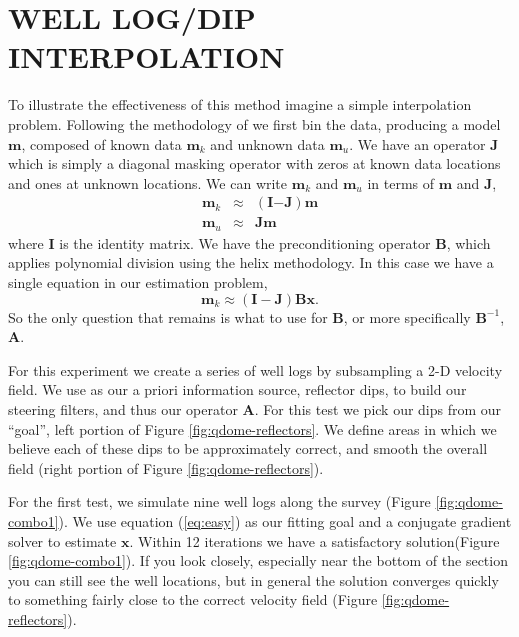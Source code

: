 \section{WELL LOG/DIP INTERPOLATION}
To illustrate the effectiveness of this method
imagine a simple interpolation problem.
Following the methodology of \cite{Fomel.sep.95.sergey1} we first bin the 
data, producing
a model $\mathbf m$, composed of known data $\mathbf m_k$ and unknown data 
$\mathbf m_u$.  We 
have an operator $\mathbf J$ which is simply a diagonal masking operator with 
zeros at known data locations and ones at unknown locations. We can write
$\mathbf m_k$ and $\mathbf m_u$ in terms of $\mathbf m$ and $\mathbf J$,
\begin{eqnarray}
\mathbf m_k &\approx& (\mathbf I\mathbf - \mathbf J)\mathbf m \\
\mathbf m_u &\approx& \mathbf J \mathbf m
\end{eqnarray}
where $\mathbf I$ is the identity matrix.  
We have the preconditioning operator $\mathbf B$, which applies polynomial
division using the helix methodology.  In this case we have a 
single equation in our estimation problem,
\begin{equation}
\mathbf m_k \approx (\mathbf I-\mathbf J) \mathbf B \mathbf x .
\label{eq:easy}
\end{equation}
So the only question that remains is what to use for $\mathbf B$, or 
more specifically $\mathbf B^{-1}$, $\mathbf A$.
\par
For this experiment  
we create a series of well logs by subsampling a 2-D velocity field.
We use as our a priori information source, reflector dips,
to build  our steering filters, and thus our operator $\mathbf A$. 
For this test we  pick our dips  from our ``goal'',
left portion of Figure \ref{fig:qdome-reflectors}.
We define areas in which we believe each of these dips to be
approximately correct, and  smooth the overall 
field (right portion of Figure \ref{fig:qdome-reflectors}).




\par
For the first test, we simulate nine well logs along the survey
(Figure \ref{fig:qdome-combo1}). We use equation (\ref{eq:easy}) as our
fitting goal and  a conjugate gradient solver to estimate $\mathbf x$.
Within 12 iterations we  have a satisfactory 
solution(Figure \ref{fig:qdome-combo1}).
If you look closely, especially near the bottom of the section you
can still see the well locations, but in general the solution 
converges quickly to something 
fairly close to the correct velocity field (Figure \ref{fig:qdome-reflectors}). 


